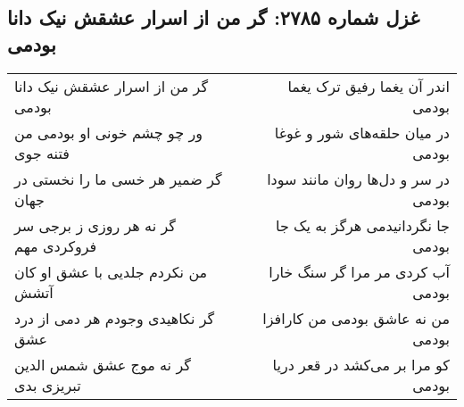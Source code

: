 \begin{center}
\section*{غزل شماره ۲۷۸۵: گر من از اسرار عشقش نیک دانا بودمی}
\label{sec:2785}
\begin{longtable}{l p{0.5cm} r}
گر من از اسرار عشقش نیک دانا بودمی
&&
اندر آن یغما رفیق ترک یغما بودمی
\\
ور چو چشم خونی او بودمی من فتنه جوی
&&
در میان حلقه‌های شور و غوغا بودمی
\\
گر ضمیر هر خسی ما را نخستی در جهان
&&
در سر و دل‌ها روان مانند سودا بودمی
\\
گر نه هر روزی ز برجی سر فروکردی مهم
&&
جا نگردانیدمی هرگز به یک جا بودمی
\\
من نکردم جلدیی با عشق او کان آتشش
&&
آب کردی مر مرا گر سنگ خارا بودمی
\\
گر نکاهیدی وجودم هر دمی از درد عشق
&&
من نه عاشق بودمی من کارافزا بودمی
\\
گر نه موج عشق شمس الدین تبریزی بدی
&&
کو مرا بر می‌کشد در قعر دریا بودمی
\\
\end{longtable}
\end{center}
